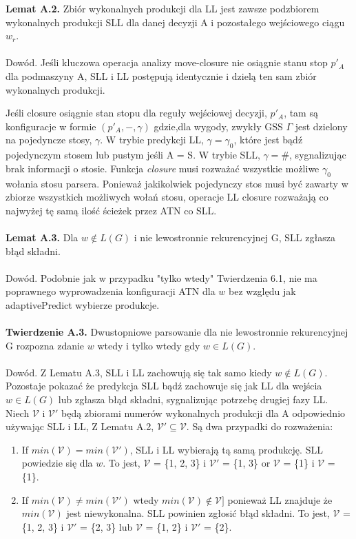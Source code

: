 \textbf{Lemat A.2.} Zbiór wykonalnych produkcji dla LL jest zawsze
podzbiorem wykonalnych produkcji SLL dla danej decyzji A i
pozostałego wejściowego ciągu $w_r$.
\\ \\
Dowód. Jeśli kluczowa operacja analizy move-closure nie
osiągnie stanu stop $p'_A$ dla podmaszyny A, SLL i LL postępują
identycznie i dzielą ten sam zbiór wykonalnych produkcji.
\par
Jeśli closure osiągnie stan stopu dla reguły wejściowej decyzji,
$p'_A$, tam są konfiguracje w formie $(p'_A, -, \gamma)$ gdzie,dla
wygody, zwykły GSS $\Gamma$ jest dzielony na pojedyncze stosy, $\gamma$. W
trybie predykcji LL, $\gamma = \gamma_0$, które jest bądź pojedynczym stosem lub
pustym jeśli A = S. W trybie SLL, $ \gamma = \#$, sygnalizując brak informacji
o stosie. Funkcja \textit{closure} musi rozważać wszystkie możliwe $\gamma_0$
wołania stosu parsera. Ponieważ jakikolwiek pojedynczy stos musi być zawarty
w zbiorze wszystkich możliwych wołań stosu, operacje LL closure
rozważają co najwyżej tę samą ilość ścieżek przez ATN co SLL.
\\ \\
\textbf{Lemat A.3.} Dla $w \notin L(G)$ i nie lewostronnie rekurencyjnej
G, SLL zgłasza błąd składni.
\\ \\
Dowód. Podobnie jak w przypadku "tylko wtedy" Twierdzenia 6.1, nie ma poprawnego
wyprowadzenia konfiguracji ATN dla $w$ bez względu jak adaptivePredict
wybierze produkcje.
\\ \\
\textbf{Twierdzenie A.3.} Dwustopniowe parsowanie dla nie lewostronnie rekurencyjnej
G rozpozna zdanie $w$ wtedy i tylko wtedy gdy $w \in L(G)$.
\\ \\
Dowód. Z Lematu A.3, SLL i LL zachowują się tak samo kiedy
$w \notin L(G)$. Pozostaje pokazać że predykcja SLL bądź
zachowuje się jak LL dla wejścia $w \in L(G)$ lub zgłasza błąd składni,
sygnalizując potrzebę drugiej fazy LL. Niech $\mathcal{V}$ i $\mathcal{V'}$ będą
zbiorami numerów wykonalnych produkcji dla A odpowiednio używając SLL i LL,
Z Lematu A.2, $\mathcal{V'} \subseteq \mathcal{V}$. Są dwa przypadki
do rozważenia:
\begin{enumerate}
\item If $min(\mathcal{V}) = min(\mathcal{V'})$, SLL i LL
wybierają tą samą produkcję.
SLL powiedzie się dla $w$. To jest, $\mathcal{V}$ = \{1, 2, 3\}
i $\mathcal{V'}$ =
\{1, 3\} or $\mathcal{V}$ = \{1\} i $\mathcal{V}$ = \{1\}.
\item If $min(\mathcal{V}) \neq min(\mathcal{V'})$ wtedy $min(\mathcal{V})
 \notin \mathcal{V]}$ ponieważ LL znajduje że
$min(\mathcal{V})$ jest niewykonalna. SLL powinien zgłosić błąd składni.
To jest, $\mathcal{V}$ = \{1, 2, 3\} i $\mathcal{V'}$ = \{2, 3\}
lub $\mathcal{V}$ = \{1, 2\} i $\mathcal{V'}$ = \{2\}.
\end{enumerate}
